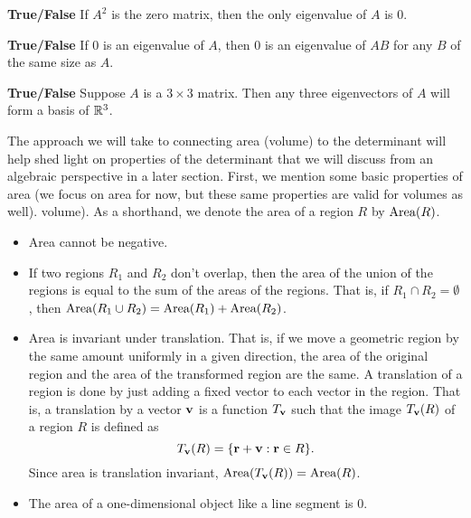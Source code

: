 

\item \textbf{True/False} If $A^2$ is the zero matrix, then the only eigenvalue of $A$ is 0.

\item \textbf{True/False} If 0 is an eigenvalue of $A$, then 0 is an eigenvalue of $AB$ for any $B$ of the same size as $A$.


\item \textbf{True/False} Suppose $A$ is a $3 \times 3$ matrix. Then any three eigenvectors of $A$ will form a basis of $\mathbb{R}^3$.


\ea
\ee

\label{sec:proj_det_area_vol}

The approach we will take to connecting area (volume) to the determinant will help shed light on properties of the determinant that we will discuss from an algebraic perspective in a later section. First, we mention some basic properties of area (we focus on area for now, but these same properties are valid for volumes as well). volume).  As a shorthand, we denote the area of a region $R$ by $\text{Area}(R)$. 
\begin{itemize}
\item Area cannot be negative.
\item If two regions $R_1$ and $R_2$ don't overlap, then the area of the union of the regions is equal to the sum of the areas of the regions. That is, if $R_1 \cap R_2 = \emptyset$, then $\text{Area}(R_1 \cup R_2) = \text{Area}(R_1) + \text{Area}(R_2)$. 
\item Area is invariant under translation. That is, if we move a geometric region by the same amount uniformly in a given direction, the area of the original region and the area of the transformed region are the same. A translation of a region is done by just adding a fixed vector to each vector in the region. That is, a translation by a vector $\mathbf{v}$ is a function $T_{\mathbf{v}}$ such that the image $T_{\mathbf{v}}(R)$ of a region $R$ is defined as 
\[T_{\mathbf{v}}(R) = \{\mathbf{r}+\mathbf{v} : \mathbf{r} \in R\}.\]
Since area is translation invariant, $\text{Area}(T_{\mathbf{v}}(R)) = \text{Area}(R)$.
\item The area of a one-dimensional object like a line segment is $0$.
\end{itemize}

